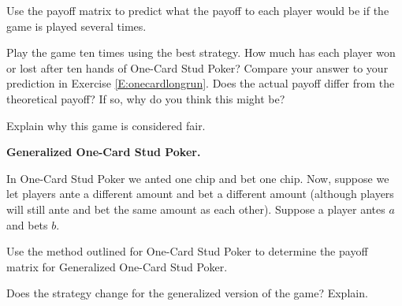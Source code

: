 \begin{xca}\label{E:onecardlongrun}
Use the payoff matrix to predict what the payoff to each player would be if the game is played several times.
\end{xca}

\begin{xca}\label{E:onecardtrials}
Play the game ten times using the best strategy. How much has each player won or lost after ten hands of One-Card Stud Poker? Compare your answer to your prediction in Exercise \ref{E:onecardlongrun}. Does the actual payoff differ from the theoretical payoff? If so, why do you think this might be?
\end{xca}

\begin{xca}\label{E:onecardfair}
Explain why this game is considered fair.
\end{xca}

\begin{example}\label{E:onecardstud}{\bf Generalized One-Card Stud Poker.}

In One-Card Stud Poker we anted one chip and bet one chip. Now, suppose we let players ante a different amount and bet  a different amount (although players will still ante and bet the same amount as each other). Suppose a player antes $a$ and bets $b$. 
\end{example}


\begin{xca}\label{E:genonecard}
Use the method outlined for One-Card Stud Poker to determine the payoff matrix for Generalized One-Card Stud Poker. 
\end{xca}


\begin{xca}
Does the strategy change for the generalized version of the game? Explain.
\end{xca}


